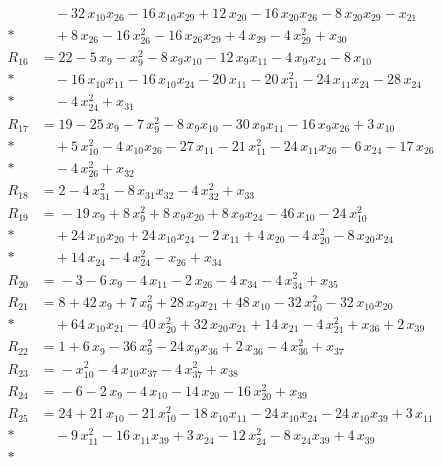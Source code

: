\begin{align*}
&\quad{} -32\,x_{10} x_{26} -16\,x_{10} x_{29} +12\,x_{20} -16\,x_{20} x_{26} -8\,x_{20} x_{29} -x_{21} \\*
&\quad{} +8\,x_{26} -16\,x_{26}^{2} -16\,x_{26} x_{29} +4\,x_{29} -4\,x_{29}^{2} +x_{30} \\[2pt]
R_{16} &={} 22 -5\,x_{9} -x_{9}^{2} -8\,x_{9} x_{10} -12\,x_{9} x_{11} -4\,x_{9} x_{24} -8\,x_{10} \\*
&\quad{} -16\,x_{10} x_{11} -16\,x_{10} x_{24} -20\,x_{11} -20\,x_{11}^{2} -24\,x_{11} x_{24} -28\,x_{24} \\*
&\quad{} -4\,x_{24}^{2} +x_{31} \\[2pt]
R_{17} &={} 19 -25\,x_{9} -7\,x_{9}^{2} -8\,x_{9} x_{10} -30\,x_{9} x_{11} -16\,x_{9} x_{26} +3\,x_{10} \\*
&\quad{} +5\,x_{10}^{2} -4\,x_{10} x_{26} -27\,x_{11} -21\,x_{11}^{2} -24\,x_{11} x_{26} -6\,x_{24} -17\,x_{26} \\*
&\quad{} -4\,x_{26}^{2} +x_{32} \\[2pt]
R_{18} &={} 2 -4\,x_{31}^{2} -8\,x_{31} x_{32} -4\,x_{32}^{2} +x_{33} \\[2pt]
R_{19} &={} -19\,x_{9} +8\,x_{9}^{2} +8\,x_{9} x_{20} +8\,x_{9} x_{24} -46\,x_{10} -24\,x_{10}^{2} \\*
&\quad{} +24\,x_{10} x_{20} +24\,x_{10} x_{24} -2\,x_{11} +4\,x_{20} -4\,x_{20}^{2} -8\,x_{20} x_{24} \\*
&\quad{} +14\,x_{24} -4\,x_{24}^{2} -x_{26} +x_{34} \\[2pt]
R_{20} &={} -3 -6\,x_{9} -4\,x_{11} -2\,x_{26} -4\,x_{34} -4\,x_{34}^{2} +x_{35} \\[2pt]
R_{21} &={} 8 +42\,x_{9} +7\,x_{9}^{2} +28\,x_{9} x_{21} +48\,x_{10} -32\,x_{10}^{2} -32\,x_{10} x_{20} \\*
&\quad{} +64\,x_{10} x_{21} -40\,x_{20}^{2} +32\,x_{20} x_{21} +14\,x_{21} -4\,x_{21}^{2} +x_{36} +2\,x_{39} \\[2pt]
R_{22} &={} 1 +6\,x_{9} -36\,x_{9}^{2} -24\,x_{9} x_{36} +2\,x_{36} -4\,x_{36}^{2} +x_{37} \\[2pt]
R_{23} &={} -x_{10}^{2} -4\,x_{10} x_{37} -4\,x_{37}^{2} +x_{38} \\[2pt]
R_{24} &={} -6 -2\,x_{9} -4\,x_{10} -14\,x_{20} -16\,x_{20}^{2} +x_{39} \\[2pt]
R_{25} &={} 24 +21\,x_{10} -21\,x_{10}^{2} -18\,x_{10} x_{11} -24\,x_{10} x_{24} -24\,x_{10} x_{39} +3\,x_{11} \\*
&\quad{} -9\,x_{11}^{2} -16\,x_{11} x_{39} +3\,x_{24} -12\,x_{24}^{2} -8\,x_{24} x_{39} +4\,x_{39} \\*

\end{align*}
